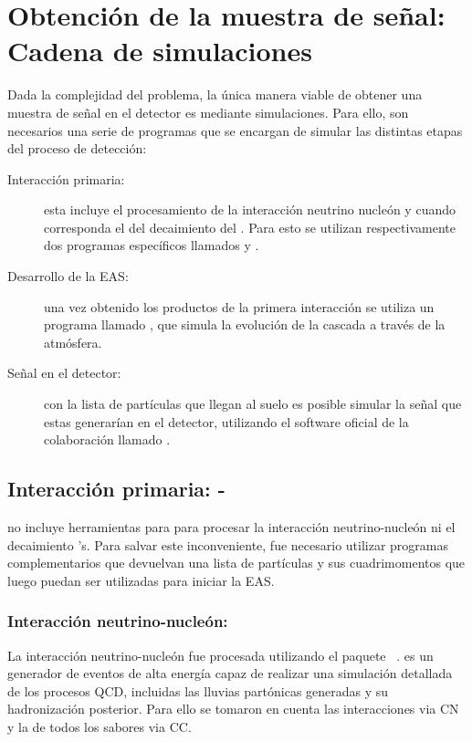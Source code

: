 \chapter{Obtención de la muestra de señal: Cadena de simulaciones}
\label{ch:simulacionAuger}

Dada la complejidad del problema, la \'unica manera viable de obtener una muestra de señal en el detector es mediante simulaciones.
Para ello, son necesarios una serie de programas que se encargan de simular las distintas etapas del proceso de detecci\'on:
\begin{description}
 \item[Interacción primaria:] esta incluye el procesamiento de la interacción neutrino nucleón y cuando corresponda el del decaimiento del \tauon{}. Para esto se utilizan respectivamente dos programas específicos llamados \herwig{} y \tauola{}.
 \item[Desarrollo de la EAS:] una vez obtenido los productos de la primera interacción se utiliza un programa llamado \aires{}, que simula la evolución de la cascada a través de la atmósfera.
 \item[Señal en el detector:] con la lista de partículas que llegan al suelo es posible simular la señal que estas generarían en el detector, utilizando el software oficial de la colaboración llamado \Offline{}.
\end{description}

	\section{Interacción primaria: \herwig{} - \tauola{}}
	
	\aires{} no incluye herramientas para para procesar la interacción neutrino-nucleón ni el decaimiento \tauon{}'s.
	Para salvar este inconveniente, fue necesario utilizar programas complementarios que devuelvan una lista de partículas y sus cuadrimomentos que luego puedan ser utilizadas para iniciar la EAS.
	
	\subsection{Interacción neutrino-nucleón: \herwig{}}
	
	La interacción neutrino-nucleón fue procesada utilizando el paquete \herwig{}~\cite{cite:herwig}.
	\herwig{} es un generador de eventos de alta energía capaz de realizar una simulación detallada de los procesos QCD, incluidas las lluvias partónicas generadas y su hadronización posterior.
	Para ello se tomaron en cuenta las interacciones via CN  y la de todos los sabores via CC.

